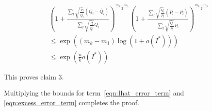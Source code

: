 \documentclass{article}
\begin{document}
\begin{align*}
& \left( 1 + 
   \frac{\sum_l \sqrt{\frac{\hat{P}_l}{\hat{Q}_l}} (Q_l - \hat{Q}_l)}
        {\sum_l \sqrt{\frac{\hat{P}_l}{\hat{Q}_l}} \hat{Q}_l} 
     \right)^{\frac{m_k - m_1}{2}} 
   \left( 1+ \frac{\sum_l \sqrt{\frac{\hat{Q}_l}{\hat{P}_l}} (\hat{P}_l - P_l)}
         {\sum_l \sqrt{\frac{\hat{Q}_l}{\hat{P}_l}} P_l } \right)^{\frac{m_k - m_1}{2}} 
\\
&\leq \exp\left( (m_k - m_1) \log(1 + o(I^*) ) \right) \\
&\leq \exp \left( \frac{n}{k} o(I^*) \right) 
\end{align*}

This proves claim 3. 

Multiplying the bounds for term~\ref{eqn:Ihat_error_term} and \ref{eqn:excess_error_term} completes the proof. 


\end{document}
